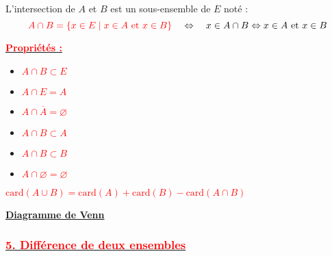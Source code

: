 \documentclass[a4paper,12pt]{article}
\begin{document}
L’intersection de $A$ et $B$ est un sous-ensemble de $E$ noté :\\
\[
\textcolor{red}{A \cap B = \left\{ x \in E \mid x \in A \text{ et } x \in B \right\}}
\quad \Leftrightarrow \quad
x \in A \cap B \Leftrightarrow x \in A \text{ et } x \in B
\]

\textbf{\underline{\textcolor{red}{Propriétés :}}}

\begin{multicols}{2}
\begin{itemize}
    \item \textcolor{red}{$A \cap B \subset E$}
    \item \textcolor{red}{$A \cap E = A$}
    \item \textcolor{red}{$A \cap \overline{A} = \varnothing$}
    \item \textcolor{red}{$A \cap B \subset A$}
    \item \textcolor{red}{$A \cap B \subset B$}
    \item \textcolor{red}{$A \cap \varnothing = \varnothing$}
\end{itemize}
\end{multicols}

\begin{center}
\textcolor{red}{\Large $\text{card}(A \cup B) = \text{card}(A) + \text{card}(B) - \text{card}(A \cap B)$}
\end{center}

\vspace{0.3cm}

\begin{center}
\end{center}
\begin{center}
\textbf{\underline{Diagramme de Venn}}
\end{center}

\subsubsection*{\underline{\textcolor{red}{5. Différence de deux ensembles}}}
\end{document}
